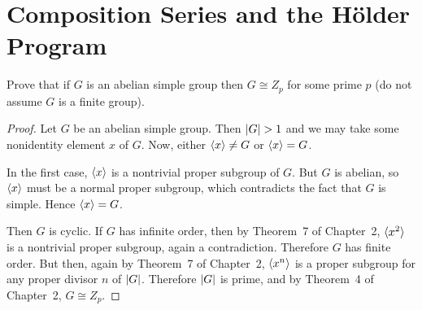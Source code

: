 \section{Composition Series and the H\"older Program}

 Prove that if $G$ is an abelian simple group then
$G\cong Z_p$ for some prime $p$ (do not assume $G$ is a finite group).
\begin{proof}
  Let $G$ be an abelian simple group. Then $\lvert{G}\rvert > 1$ and we may
  take some nonidentity element $x$ of $G$. Now, either $\langle{x}\rangle\neq G$
  or $\langle{x}\rangle = G$.

  In the first case, $\langle{x}\rangle$ is a nontrivial proper subgroup of
  $G$. But $G$ is abelian, so $\langle{x}\rangle$ must be a normal proper
  subgroup, which contradicts the fact that $G$ is simple. Hence
  $\langle{x}\rangle = G$.

  Then $G$ is cyclic. If $G$ has infinite order, then by Theorem~7 of
  Chapter~2, $\langle{x^2}\rangle$ is a nontrivial proper subgroup, again a
  contradiction. Therefore $G$ has finite order. But then, again by
  Theorem~7 of Chapter~2, $\langle{x^n}\rangle$ is a proper subgroup for any
  proper divisor $n$ of $\lvert{G}\rvert$. Therefore $\lvert{G}\rvert$ is prime, and
  by Theorem~4 of Chapter~2, $G\cong Z_p$.
\end{proof}
